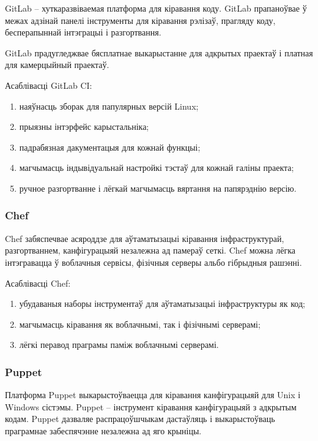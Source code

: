 GitLab -- хуткаразвіваемая платформа для кіравання коду.
GitLab прапаноўвае ў межах адзінай панелі
інструменты для кіравання рэлізаў,
прагляду коду, бесперапыннай інтэграцыі і разгортвання.

GitLab прадугледжвае бясплатнае выкарыстанне для адкрытых праектаў і
платная для камерцыйный праектаў.

Асаблівасці GitLab CI:
\begin{enumerate}
    \item наяўнасць зборак для папулярных версій Linux;
    \item прыязны інтэрфейс карыстальніка;
    \item падрабязная дакументацыя для кожнай функцыі;
    \item магчымасць індывідуальнай настройкі тэстаў
          для кожнай галіны праекта;
    \item ручное разгортванне і лёгкай магчымасць вяртання
          на папярэднію версію.
\end{enumerate}

\subsubsection{Chef}

Chef забяспечвае асяроддзе для аўтаматызацыі кіравання
інфраструктурай, разгортваннем, канфігурацыяй незалежна
ад памераў сеткі. Chef можна лёгка інтэгравацца ў
воблачныя сервісы, фізічныя серверы альбо гібрыдныя рашэнні.

Асаблівасці Chef:
\begin{enumerate}
    \item убудаваныя наборы інструментаў для аўтаматызацыі
          інфраструктуры як код;
    \item магчымасць кіравання як воблачнымі, так і фізічнымі
          серверамі;
    \item лёгкі перавод праграмы паміж воблачнымі серверамі.
\end{enumerate}

\subsubsection{Puppet}

Платформа Puppet выкарыстоўваецца для кіравання канфігурацыяй для
Unix і Windows сістэмы.
Puppet -- інструмент кіравання канфігурацыяй з адкрытым кодам.
Puppet дазваляе распрацоўшчыкам дастаўляць і выкарыстоўваць
праграмнае забеспячэнне незалежна ад яго крыніцы.

